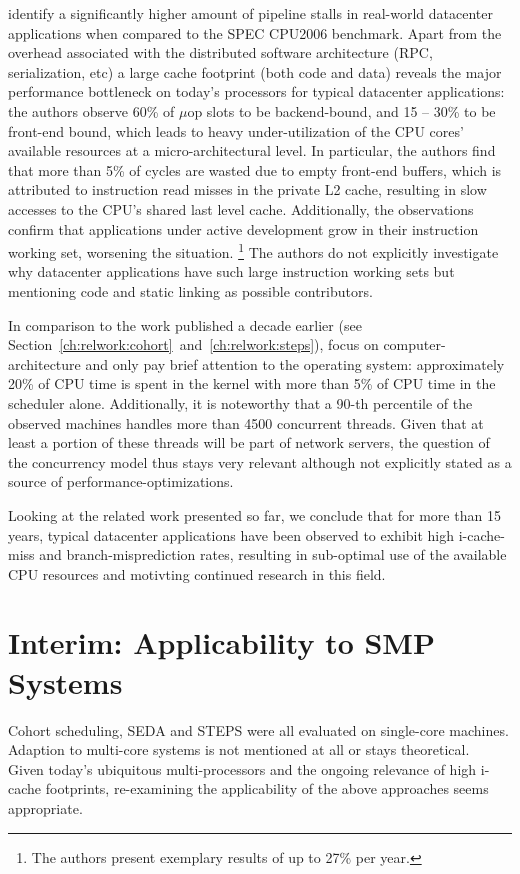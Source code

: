 \documentclass[12pt,a4paper]{book}
\begin{document}
\citeauthor*{kanev2015profiling} identify a significantly higher amount of pipeline stalls in real-world datacenter applications when compared to the SPEC CPU2006 benchmark.
Apart from the overhead associated with the distributed software architecture (RPC, serialization, etc) %
a large cache footprint (both code and data) reveals the major performance bottleneck on today's processors for typical datacenter applications:
the authors observe 60\% of $\mu$op slots to be backend-bound, and 15 -- 30\% to be front-end bound, which leads to heavy under-utilization of the CPU cores' available resources at a micro-architectural level.
In particular, the authors find that more than 5\% of cycles are wasted due to empty front-end buffers, which is attributed to instruction read misses in the private L2 cache, resulting in slow accesses to the CPU's shared last level cache.
Additionally, the observations confirm that applications under active development grow in their instruction working set, worsening the situation.%
\footnote{The authors present exemplary results of up to 27\% per year.}
The authors do not explicitly investigate why datacenter applications have such large instruction working sets but mentioning  code and static linking as possible contributors.~\cite{kanev2015profiling}

In comparison to the work published a decade earlier (see Section~\ref{ch:relwork:cohort}~and~\ref{ch:relwork:steps}),
\citeauthor*{kanev2015profiling} focus on computer-architecture and only pay brief attention to the operating system:
approximately 20\% of CPU time is spent in the kernel with more than 5\% of CPU time in the scheduler alone.
Additionally, it is noteworthy that a 90-th percentile of the observed machines handles more than 4500 concurrent threads.
Given that at least a portion of these threads will be part of network servers, the question of the concurrency model thus stays very relevant although not explicitly stated as a source of performance-optimizations.~\cite{kanev2015profiling}

Looking at the related work presented so far, we conclude that for more than 15 years, typical datacenter applications have been observed to exhibit high i-cache-miss and branch-misprediction rates, resulting in sub-optimal use of the available CPU resources and motivting continued research in this field.

\section{Interim: Applicability to SMP Systems}
Cohort scheduling, SEDA and STEPS were all evaluated on single-core machines.
Adaption to multi-core systems is not mentioned at all or stays theoretical.~\cite{steps,harizopoulos2003case}
Given today's ubiquitous multi-processors and the ongoing relevance of high i-cache footprints, re-examining the applicability of the above approaches seems appropriate.
\end{document}
